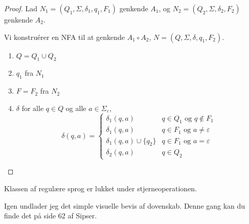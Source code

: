 \begin{proof}
	Lad $N_{1} =(Q_{1}, \Sigma, \delta_{1}, q_{1}, F_{1})$ genkende $A_{1}$, og $N_{2} = (Q_{2}, \Sigma, \delta_{2}, F_{2})$ genkende $A_{2}$.

	Vi konstruérer en NFA til at genkende $A_{1} \circ A_{2}$, $N = (Q, \Sigma, \delta, q_{1}, F_{2})$.
	\begin{enumerate}
		\item $Q = Q_{1} \cup Q_{2}$
		\item $q_{1}$ fra $N_{1}$
		\item $F = F_{2}$ fra $N_{2}$
		\item $\delta$ for alle $q \in Q$ og alle $a \in \Sigma_{\varepsilon}$,
		      \begin{equation*}
			      \delta(q,a) = \begin{cases}
				      \delta_{1}(q,a)                & q \in Q_{1} \text{ og } q \notin F_{1}     \\
				      \delta_{1}(q,a)                & q \in F_{1} \text{ og } a \neq \varepsilon \\

				      \delta_{1}(q,a) \cup \{q_{2}\} & q \in F_{1} \text{ og } a = \varepsilon    \\
				      \delta_{2}(q,a)                & q \in Q_{2}
			      \end{cases}
		      \end{equation*}
	\end{enumerate}
\end{proof}


\begin{theorem}
	Klassen af regulære sprog er lukket under stjerneoperationen.
\end{theorem}


Igen undlader jeg det simple visuelle bevis af dovenskab. Denne gang kan du finde det på side 62 af Sipser.


